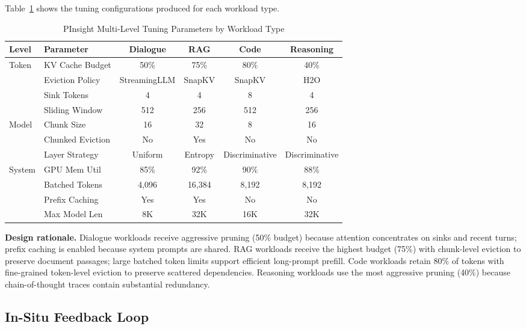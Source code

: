 \documentclass[conference]{IEEEtran}
\begin{document}
Table~\ref{tab:tuning_params} shows the tuning configurations produced for each workload type.

\begin{table}[t]
\centering
\caption{PInsight Multi-Level Tuning Parameters by Workload Type}
\label{tab:tuning_params}
\begin{tabular}{@{}llcccc@{}}
\toprule
\textbf{Level} & \textbf{Parameter} & \textbf{Dialogue} & \textbf{RAG} & \textbf{Code} & \textbf{Reasoning} \\
\midrule
\multirow{4}{*}{Token} & KV Cache Budget & 50\% & 75\% & 80\% & 40\% \\
& Eviction Policy & StreamingLLM & SnapKV & SnapKV & H2O \\
& Sink Tokens & 4 & 4 & 8 & 4 \\
& Sliding Window & 512 & 256 & 512 & 256 \\
\midrule
\multirow{3}{*}{Model} & Chunk Size & 16 & 32 & 8 & 16 \\
& Chunked Eviction & No & Yes & No & No \\
& Layer Strategy & Uniform & Entropy & Discriminative & Discriminative \\
\midrule
\multirow{4}{*}{System} & GPU Mem Util & 85\% & 92\% & 90\% & 88\% \\
& Batched Tokens & 4,096 & 16,384 & 8,192 & 8,192 \\
& Prefix Caching & Yes & Yes & No & No \\
& Max Model Len & 8K & 32K & 16K & 32K \\
\bottomrule
\end{tabular}
\end{table}

\textbf{Design rationale.} Dialogue workloads receive aggressive pruning (50\% budget) because attention concentrates on sinks and recent turns; prefix caching is enabled because system prompts are shared. RAG workloads receive the highest budget (75\%) with chunk-level eviction to preserve document passages; large batched token limits support efficient long-prompt prefill. Code workloads retain 80\% of tokens with fine-grained token-level eviction to preserve scattered dependencies. Reasoning workloads use the most aggressive pruning (40\%) because chain-of-thought traces contain substantial redundancy.

\subsection{In-Situ Feedback Loop}
\end{document}
